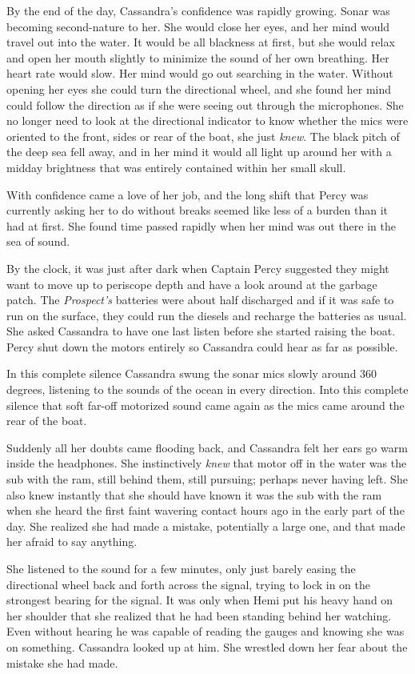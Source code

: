 \documentclass[]{scrbook}
\begin{document}
By the end of the day, Cassandra's confidence was rapidly growing. Sonar
was becoming second-nature to her. She would close her eyes, and her
mind would travel out into the water. It would be all blackness at
first, but she would relax and open her mouth slightly to minimize the
sound of her own breathing. Her heart rate would slow. Her mind would go
out searching in the water. Without opening her eyes she could turn the
directional wheel, and she found her mind could follow the direction as
if she were seeing out through the microphones. She no longer need to
look at the directional indicator to know whether the mics were oriented
to the front, sides or rear of the boat, she just \emph{knew}. The black
pitch of the deep sea fell away, and in her mind it would all light up
around her with a midday brightness that was entirely contained within
her small skull.

With confidence came a love of her job, and the long shift that Percy
was currently asking her to do without breaks seemed like less of a
burden than it had at first. She found time passed rapidly when her mind
was out there in the sea of sound.

By the clock, it was just after dark when Captain Percy suggested they
might want to move up to periscope depth and have a look around at the
garbage patch. The \emph{Prospect's} batteries were about half
discharged and if it was safe to run on the surface, they could run the
diesels and recharge the batteries as usual. She asked Cassandra to have
one last listen before she started raising the boat. Percy shut down the
motors entirely so Cassandra could hear as far as possible.

In this complete silence Cassandra swung the sonar mics slowly around
360 degrees, listening to the sounds of the ocean in every direction.
Into this complete silence that soft far-off motorized sound came again
as the mics came around the rear of the boat.

Suddenly all her doubts came flooding back, and Cassandra felt her ears
go warm inside the headphones. She instinctively \emph{knew} that motor
off in the water was the sub with the ram, still behind them, still
pursuing; perhaps never having left. She also knew instantly that she
should have known it was the sub with the ram when she heard the first
faint wavering contact hours ago in the early part of the day. She
realized she had made a mistake, potentially a large one, and that made
her afraid to say anything.

She listened to the sound for a few minutes, only just barely easing the
directional wheel back and forth across the signal, trying to lock in on
the strongest bearing for the signal. It was only when Hemi put his
heavy hand on her shoulder that she realized that he had been standing
behind her watching. Even without hearing he was capable of reading the
gauges and knowing she was on something. Cassandra looked up at him. She
wrestled down her fear about the mistake she had made.
\end{document}
